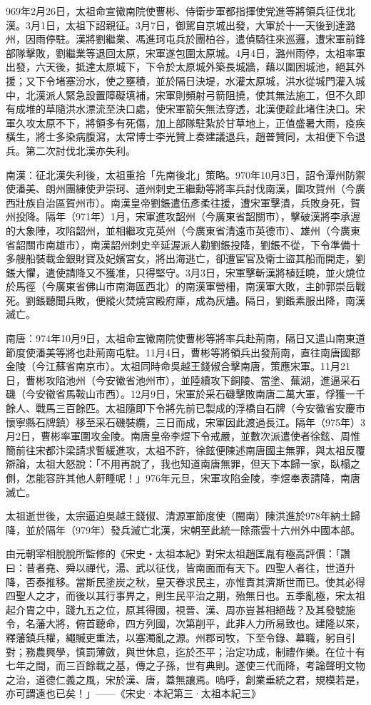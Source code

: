 969年2月26日，太祖命宣徽南院使曹彬、侍衛步軍都指揮使党進等將領兵征伐北漢。3月1日，太祖下詔親征。3月7日，御駕自京城出發，大軍於十一天後到達潞州，因雨停駐。漢將劉繼業、馮進珂屯兵於團柏谷，遣偵騎往來巡邏，遭宋軍前鋒部隊擊敗，劉繼業等退回太原，宋軍遂包圍太原城。4月4日，潞州雨停，太祖率軍出發，六天後，抵達太原城下，下令於太原城外築長城牆，藉以圍困城池，絕其外援；又下令堵塞汾水，使之壅積，並於隔日決堤，水灌太原城，洪水從城門灌入城中，北漢派人緊急設置障礙填補，宋軍則頻射弓箭阻撓，使其無法施工，但不久即有成堆的草隨洪水漂流至決口處，使宋軍箭矢無法穿透，北漢便趁此堵住決口。宋軍久攻太原不下，將領多有死傷，加上部隊駐紮於甘草地上，正值盛暑大雨，疫疾橫生，將士多染病腹瀉，太常博士李光贊上奏建議退兵，趙普贊同，太祖便下令退兵。第二次討伐北漢亦失利。

南漢：征北漢失利後，太祖重拾「先南後北」策略。970年10月3日，詔令潭州防禦使潘美、朗州團練使尹崇珂、道州刺史王繼勳等將率兵討伐南漢，圍攻賀州（今廣西壯族自治區賀州市）。南漢皇帝劉鋹遣伍彥柔往援，遭宋軍擊潰，兵敗身死，賀州投降。隔年（971年）1月，宋軍進攻韶州（今廣東省韶關市），擊破漢將李承渥的大象陣，攻陷韶州，並相繼攻克英州（今廣東省清遠市英德市）、雄州（今廣東省韶關市南雄市），南漢韶州刺史辛延渥派人勸劉鋹投降，劉鋹不從，下令準備十多艘船裝載金銀財寶及妃嬪宮女，將出海逃亡，卻遭宦官及衛士盜其船而開走，劉鋹大懼，遣使請降又不獲准，只得堅守。3月3日，宋軍擊斬漢將植廷曉，並火燒位於馬徑（今廣東省佛山市南海區西北）的南漢軍營柵，南漢軍大敗，主帥郭崇岳戰死。劉鋹聽聞兵敗，便縱火焚燒宮殿府庫，成為灰燼。隔日，劉鋹素服出降，南漢滅亡。

南唐：974年10月9日，太祖命宣徽南院使曹彬等將率兵赴荊南，隔日又遣山南東道節度使潘美等將也赴荊南屯駐。11月4日，曹彬等將領兵出發荊南，直往南唐國都金陵（今江蘇省南京市）。太祖同時命吳越王錢俶合擊南唐，策應宋軍。11月21日，曹彬攻陷池州（今安徽省池州市），並陸續攻下銅陵、當塗、蕪湖，進逼采石磯（今安徽省馬鞍山市西）。12月9日，宋軍於采石磯擊敗南唐二萬大軍，俘獲一千餘人、戰馬三百餘匹。太祖隨即下令將先前已製成的浮橋自石牌（今安徽省安慶市懷寧縣石牌鎮）移至采石磯裝纜，三日而成，宋軍因此渡過長江。隔年（975年）3月2日，曹彬率軍圍攻金陵。南唐皇帝李煜下令戒嚴，並數次派遣使者徐鉉、周惟簡前往宋都汴梁請求暫緩進攻，太祖不許，徐鉉便陳述南唐國主無罪，與太祖反覆辯論，太祖大怒說：「不用再說了，我也知道南唐無罪，但天下本歸一家，臥榻之側，怎能容許其他人鼾睡呢！」976年元旦，宋軍攻陷金陵，李煜奉表請降，南唐滅亡。

太祖逝世後，太宗逼迫吳越王錢俶、清源軍節度使（閩南）陳洪進於978年納土歸降，並於隔年（979年）發兵滅亡北漢，宋朝至此統一除燕雲十六州外中國本部。

由元朝宰相脫脫所監修的《宋史‧太祖本紀》對宋太祖趙匡胤有極高評價：「讚曰：昔者堯、舜以禪代，湯、武以征伐，皆南面而有天下。四聖人者往，世道升降，否泰推移。當斯民塗炭之秋，皇天眷求民主，亦惟責其濟斯世而已。使其必得四聖人之才，而後以其行事畀之，則生民平治之期，殆無日也。五季亂極，宋太祖起介胄之中，踐九五之位，原其得國，視晉、漢、周亦豈甚相絕哉？及其發號施令，名藩大將，俯首聽命，四方列國，次第削平，此非人力所易致也。建隆以來，釋藩鎮兵權，繩贓吏重法，以塞濁亂之源。州郡司牧，下至令錄、幕職，躬自引對；務農興學，慎罰薄斂，與世休息，迄於丕平；治定功成，制禮作樂。在位十有七年之間，而三百餘載之基，傳之子孫，世有典則。遂使三代而降，考論聲明文物之治，道德仁義之風，宋於漢、唐，蓋無讓焉。嗚呼，創業垂統之君，規模若是，亦可謂遠也已矣！」——《宋史·本紀第三·太祖本紀三》

